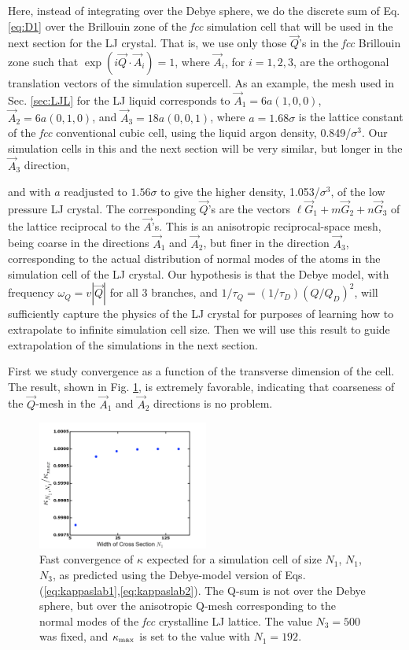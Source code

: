 \documentclass[aps,prb,twocolumn,showpacs,superscriptaddress]{revtex4-1}\begin{tiny}\end{tiny}
\begin{document}
Here, instead of integrating over the Debye sphere, we do the 
discrete sum of Eq. \ref{eq:D1} over the Brillouin zone of the {\it fcc} simulation cell
that will be used in the next section for the LJ crystal.  That is, we use only those
$\vec{Q}$'s  in the {\it fcc} Brillouin zone such that $\exp(i\vec{Q}\cdot\vec{A}_i)=1$,
where $\vec{A}_i$, for $i=1,2,3$, are the orthogonal translation vectors of the simulation
supercell.  As an example, the mesh used in Sec. \ref{sec:LJL} for the LJ liquid corresponds
to $\vec{A}_1 = 6a(1,0,0)$, $\vec{A}_2 = 6a(0,1,0)$, and $\vec{A}_3 = 18a(0,0,1)$,
where $a=1.68\sigma$ is the lattice constant of the {\it fcc} conventional cubic cell, using the
liquid argon density, 0.849/$\sigma^3$.
Our simulation cells in this and the next section will be very similar, but longer in the $\vec{A}_3$ direction,
{and with $a$ readjusted to $1.56\sigma$ to give the higher density\cite{Verlet,Ladd},
1.053/$\sigma^3$, of the low pressure LJ crystal.
The corresponding $\vec{Q}$'s are the vectors $\ell\vec{G}_1+m\vec{G}_2+n\vec{G}_3$
of the lattice reciprocal to the $\vec{A}$'s.  This
 is an anisotropic reciprocal-space mesh, being coarse in the directions $\vec{A}_1$ and $\vec{A}_2$, but finer
in the direction $\vec{A}_3$, corresponding to the actual distribution of normal modes of the atoms
in the simulation cell of the LJ crystal.  Our hypothesis is that the Debye model, with frequency
$\omega_Q = v|\vec{Q}|$ for all 3 branches, and $1/\tau_Q = (1/\tau_D)(Q/Q_D)^2$, will sufficiently
capture the physics of the LJ crystal for purposes of learning how to extrapolate to infinite
simulation cell size.  Then we will use this result to guide extrapolation of the simulations
in the next section.

First we study convergence as a function of the transverse dimension of the cell.  The
result, shown in Fig. \ref{fig:cross}, is extremely favorable, indicating that coarseness of
the $\vec{Q}$-mesh in the $\vec{A}_1$ and $\vec{A}_2$ directions is no problem.
\par
\begin{figure}[top]
\includegraphics[angle=0,width=0.5\textwidth]{Cross14.pdf}%
\caption{\label{fig:cross} Fast convergence of $\kappa$ expected for a simulation cell
of size $N_1$, $N_1$, $N_3$, as predicted using the Debye-model version of 
Eqs.(\ref{eq:kappaslab1},\ref{eq:kappaslab2}).  The Q-sum is not over the
Debye sphere, but over the anisotropic Q-mesh corresponding to the
normal modes of the {\it fcc} crystalline LJ lattice.  The value $N_3 = 500$ was fixed,
and $\kappa_{\rm max}$ is set to the value with $N_1=192$.}
\label{fig:cross}
\end{figure}
\par

}
\end{document}
